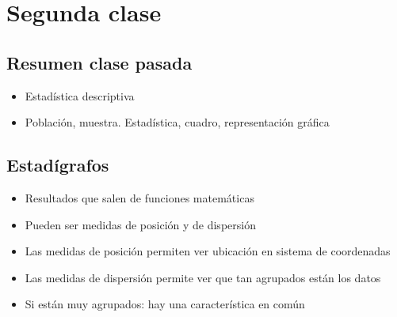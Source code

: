 \section{Segunda clase}

\subsection{Resumen clase pasada}

\begin{itemize}
    \item Estadística descriptiva
    \item Población, muestra. Estadística, cuadro, representación gráfica
\end{itemize}

\subsection{Estadígrafos}

\begin{itemize}
    \item Resultados que salen de funciones matemáticas
    \item Pueden ser medidas de posición y de dispersión
    \item Las medidas de posición permiten ver ubicación en sistema de coordenadas
    \item Las medidas de dispersión permite ver que tan agrupados están los datos
    \item Si están muy agrupados: hay una característica en común
\end{itemize}
